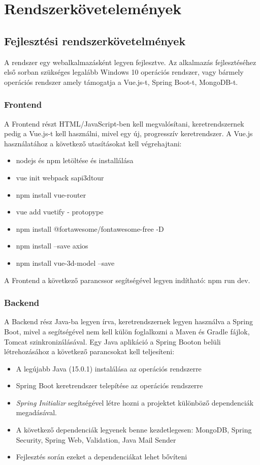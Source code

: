 \section{Rendszerkövetelemények}

\subsection{Fejlesztési rendszerkövetelmények}
A rendszer egy webalkalmazásként legyen fejlesztve. Az alkalmazás fejlesztéséhez első sorban szükséges legalább Windows 10 operációs rendszer, vagy bármely operációs rendszer amely támogatja a Vue.js-t, Spring Boot-t, MongoDB-t.

\subsubsection{Frontend}
A Frontend részt HTML/JavaScript-ben kell  megvalósítani, keretrendszernek pedig a Vue.js-t
kell használni, mivel egy új, progresszív keretrendszer. A Vue.js használatához a következő utasításokat kell végrehajtani:
\begin{itemize}
	\item nodejs és npm letöltése és installálása
	\item vue init webpack sapi3dtour
	\item npm install vue-router
	\item vue add vuetify -  protopype
	\item npm install @fortawesome/fontawesome-free -D
	\item npm install --save axios
	\item npm install vue-3d-model --save
\end{itemize}

A Frontend a következő parancssor segítségével legyen indítható: npm run dev.

\subsubsection{Backend}
A Backend rész Java-ba legyen írva, keretrendszernek legyen használva a Spring Boot, mivel a segítségével nem kell külön foglalkozni a Maven és Gradle fájlok, Tomcat szinkronizálásával. Egy Java aplikáció a Spring Booton belüli létrehozásához a következő parancsokat kell teljesíteni:
\begin{itemize}
	\item A legújabb Java (15.0.1) instalálása az operációs rendszerre 
	\item Spring Boot keretrendszer telepítése az operációs rendszerre
	\item{\textit{ Spring Initializr}\footnotemark} segítségével létre hozni a projektet különböző dependenciák megadásával.
	\item A következő dependenciák legyenek benne kezdetlegesen: MongoDB, Spring Security, Spring Web, Validation, Java Mail Sender
	\item Fejlesztés során ezeket a dependenciákat lehet bővíteni
\end{itemize}

